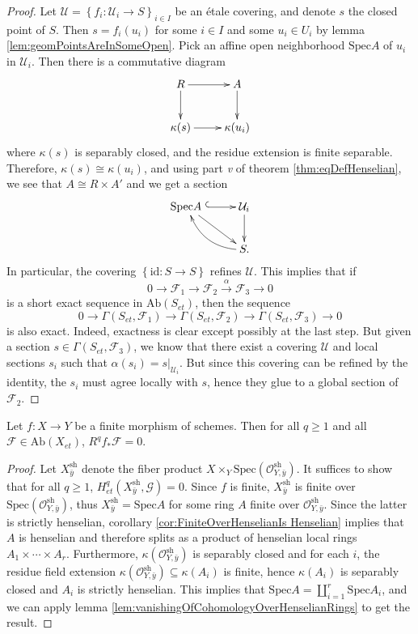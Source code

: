 \begin{proof}
Let $\mathcal{U} = \left\{f_i : \mathcal{U}_i \to S \right\}_{i\in I}$ be an \'etale covering, and denote $s$ the closed point of $S$. Then $s = f_i (u_i)$ for some $i\in I$ and some $u_i \in U_i$ by lemma \ref{lem:geomPointsAreInSomeOpen}. Pick an affine open neighborhood $\text{Spec} A$ of $u_i$ in $\mathcal{U}_i$. Then there is a commutative diagram
$$
\xymatrix{
R \ar[r] \ar[d] & A \ar[d] \\
{\kappa(s)} \ar[r] & {\kappa(u_i)}
}
$$
where $\kappa(s)$ is separably closed, and the residue extension is finite separable. Therefore, $\kappa(s) \cong \kappa(u_i)$, and using part {\it v} of theorem \ref{thm:eqDefHenselian}, we see that $A \cong R\times A'$ and we get a section
$$
\xymatrix{
{\text{Spec} A\ }\ar[dr] \ar@{^{(}->}[r] & {\mathcal{U}_i} \ar[d]\\
& {S.} \ar@/^1pc/[ul]
}
$$
In particular, the covering $\left\{\text{id} : S\to S\right\}$ refines $\mathcal{U}$. This implies that if 
$$
0 \to \mathcal{F}_1\to \mathcal{F}_2 \xrightarrow{\alpha} \mathcal{F}_3\to 0
$$
is a short exact sequence in $\text{Ab}(S_{et})$, then the sequence
$$
0 \to \Gamma(S_{et}, \mathcal{F}_1) \to \Gamma(S_{et}, \mathcal{F}_2) \to \Gamma(S_{et}, \mathcal{F}_3)\to 0
$$
is also exact. Indeed, exactness is clear except possibly at the last step. But given a section $s \in \Gamma(S_{et}, \mathcal{F}_3)$, we know that there exist a covering $\mathcal{U}$ and local sections $s_i$ such that $\alpha (s_i) = s|_{\mathcal{U}_i}$. But since this covering can be refined by the identity, the $s_i$ must agree locally with $s$, hence they glue to a global section of $\mathcal{F}_2$.
\end{proof}

\begin{proposition} \label{prop:FiniteHigherDirectImagesVanish}
Let $f: X\to Y$ be a finite morphism of schemes. Then for all $q\geq 1$ and all $\mathcal{F}\in \text{Ab}(X_{et})$, $R^q f_*\mathcal{F}=0$. 
\end{proposition}

\begin{proof}
Let $X_{\bar y}^\text{sh}$ denote the fiber product $X\times_Y \text{Spec}(\mathcal{O}_{Y, \bar y}^\text{sh})$. It suffices to show that for all $q\geq 1$, $H_{et}^q(X_{\bar y}^\text{sh}, \mathcal{G})=0$. Since $f$ is finite, $X_{\bar y}^\text{sh}$ is finite over $\text{Spec}(\mathcal{O}_{Y, \bar y}^\text{sh})$, thus $X_{\bar y}^\text{sh} = \text{Spec} A$ for some ring $A$ finite over $\mathcal{O}_{Y, \bar y}^\text{sh}$. Since the latter is strictly henselian, corollary \ref{cor:FiniteOverHenselianIs Henselian} implies that $A$ is henselian and therefore splits as a product of henselian local rings $A_1 \times \cdots \times A_r$. Furthermore, $\kappa(\mathcal{O}_{Y, \bar y}^\text{sh})$ is separably closed and for each $i$, the residue field extension $\kappa(\mathcal{O}_{Y, \bar y}^\text{sh}) \subseteq \kappa(A_i)$ is finite, hence $\kappa(A_i)$ is separably closed  and $A_i$ is strictly henselian. This implies that $\text{Spec} A = \coprod_{i=1}^r \text{Spec} A_i$, and we can apply lemma \ref{lem:vanishingOfCohomologyOverHenselianRings} to get the result.
\end{proof}

